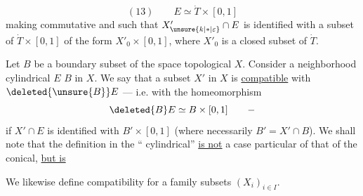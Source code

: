 \[
(13)\qquad E\simeq\dot T\times[0,1]
\]
making commutative
and such that $X'_{\unsure{k|*|\varepsilon}}\cap E$ is identified with a subset
of $\dot T\times[0,1]$ of the form $X'_0\times[0,1]$, where $X'_0$
is a closed subset of $\dot T$.

Let $B$ be a  boundary subset of the space
topological $X$. Consider a neighborhood
cylindrical $E$  $B$ in $X$. We
say that a  subset $X'$ in $X$ is \uline{compatible}
with $\deleted{\unsure{B}}E$ --- i.e. with the homeomorphism
\[
\deleted{B}E\simeq B\times[0,1]\qquad -
\]
if $X'\cap E$ is identified with $B'\times[0,1]$
(where necessarily  $B'=X'\cap B$).
We shall note that the definition in the
``
 cylindrical'' \uline{is not} a case
particular of that of the 
conical, \uline{but is}

We likewise define compatibility for
a  family  subsets $(X_i)_{i\in I}$.
